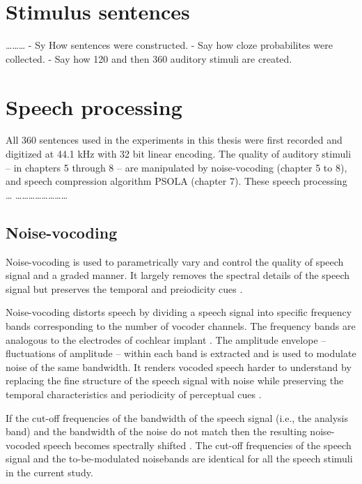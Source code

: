 \documentclass[a4paper, nobind]{templates/ociamthesis}
\begin{document}
\minitoc 

\hypertarget{stimulus-sentences}{%
\section{Stimulus sentences}\label{stimulus-sentences}}

\ldots\ldots\ldots{}
- Sy How sentences were constructed.
- Say how cloze probabilites were collected.
- Say how 120 and then 360 auditory stimuli are created.

\hypertarget{speech-processing}{%
\section{Speech processing}\label{speech-processing}}

All 360 sentences used in the experiments in this thesis were first recorded and digitized at 44.1 kHz with 32 bit linear encoding.
The quality of auditory stimuli -- in chapters 5 through 8 -- are manipulated by noise-vocoding (chapter 5 to 8), and speech compression algorithm PSOLA (chapter 7).
These speech processing \ldots{} \ldots\ldots\ldots\ldots\ldots\ldots\ldots\ldots{}

\hypertarget{noise-vocoding}{%
\subsection{Noise-vocoding}\label{noise-vocoding}}

Noise-vocoding is used to parametrically vary and control the quality of speech signal and a graded manner.
It largely removes the spectral details of the speech signal but preserves the temporal and preiodicity cues \autocite{Rosen1999}.

Noise-vocoding distorts speech by dividing a speech signal into specific frequency bands corresponding to the number of vocoder channels.
The frequency bands are analogous to the electrodes of cochlear implant \autocite{Shannon1995,Loizou1999,Shannon2004}.
The amplitude envelope -- fluctuations of amplitude -- within each band is extracted and is used to modulate noise of the same bandwidth.
It renders vocoded speech harder to understand by replacing the fine structure of the speech signal with noise while preserving the temporal characteristics and periodicity of perceptual cues \autocite{Rosen1999}.

If the cut-off frequencies of the bandwidth of the speech signal (i.e., the analysis band) and the bandwidth of the noise do not match then the resulting noise-vocoded speech becomes spectrally shifted \autocite[e.g.,][]{Faulkner2012}.
The cut-off frequencies of the speech signal and the to-be-modulated noisebands are identical for all the speech stimuli in the current study.
\end{document}
